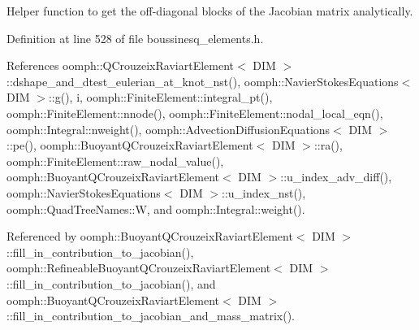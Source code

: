 Helper function to get the off-\/diagonal blocks of the Jacobian matrix analytically. 



Definition at line 528 of file boussinesq\+\_\+elements.\+h.



References oomph\+::\+Q\+Crouzeix\+Raviart\+Element$<$ D\+I\+M $>$\+::dshape\+\_\+and\+\_\+dtest\+\_\+eulerian\+\_\+at\+\_\+knot\+\_\+nst(), oomph\+::\+Navier\+Stokes\+Equations$<$ D\+I\+M $>$\+::g(), i, oomph\+::\+Finite\+Element\+::integral\+\_\+pt(), oomph\+::\+Finite\+Element\+::nnode(), oomph\+::\+Finite\+Element\+::nodal\+\_\+local\+\_\+eqn(), oomph\+::\+Integral\+::nweight(), oomph\+::\+Advection\+Diffusion\+Equations$<$ D\+I\+M $>$\+::pe(), oomph\+::\+Buoyant\+Q\+Crouzeix\+Raviart\+Element$<$ D\+I\+M $>$\+::ra(), oomph\+::\+Finite\+Element\+::raw\+\_\+nodal\+\_\+value(), oomph\+::\+Buoyant\+Q\+Crouzeix\+Raviart\+Element$<$ D\+I\+M $>$\+::u\+\_\+index\+\_\+adv\+\_\+diff(), oomph\+::\+Navier\+Stokes\+Equations$<$ D\+I\+M $>$\+::u\+\_\+index\+\_\+nst(), oomph\+::\+Quad\+Tree\+Names\+::W, and oomph\+::\+Integral\+::weight().



Referenced by oomph\+::\+Buoyant\+Q\+Crouzeix\+Raviart\+Element$<$ D\+I\+M $>$\+::fill\+\_\+in\+\_\+contribution\+\_\+to\+\_\+jacobian(), oomph\+::\+Refineable\+Buoyant\+Q\+Crouzeix\+Raviart\+Element$<$ D\+I\+M $>$\+::fill\+\_\+in\+\_\+contribution\+\_\+to\+\_\+jacobian(), and oomph\+::\+Buoyant\+Q\+Crouzeix\+Raviart\+Element$<$ D\+I\+M $>$\+::fill\+\_\+in\+\_\+contribution\+\_\+to\+\_\+jacobian\+\_\+and\+\_\+mass\+\_\+matrix().

\mbox{\label{classoomph_1_1BuoyantQCrouzeixRaviartElement_a5c64aaf8e6cefc31d89c62c28fc6f19b}} 

